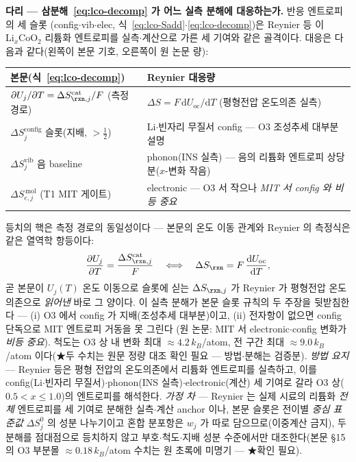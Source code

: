 \begin{srcbox}
\textbf{다리 --- 삼분해~\eqref{eq:lco-decomp} 가 어느 실측 분해에 대응하는가.} 반응 엔트로피의 세 슬롯
(config$\cdot$vib$\cdot$elec, 식~\eqref{eq:lco-Sadd}$\cdot$\eqref{eq:lco-decomp})은 Reynier
등\cite{reynier2004} 이 $\mathrm{Li}_x\mathrm{CoO_2}$ 리튬화 엔트로피를 실측$\cdot$계산으로 가른 세 기여와
같은 골격이다. 대응은 다음과 같다(왼쪽이 본문 기호, 오른쪽이 원 논문 량):
\begin{center}\footnotesize
\begin{tabular}{@{}ll@{}}
\hline
본문(식~\eqref{eq:lco-decomp}) & Reynier\cite{reynier2004} 대응량 \\
\hline
$\partial U_j/\partial T=\Delta S_{\rxn,j}^\mathrm{cat}/F$ (측정 경로) & $\Delta S=F\,\mathrm dU_\mathrm{oc}/\mathrm dT$ (평형전압 온도의존 실측) \\
$\Delta S_j^\mathrm{config}$ 슬롯(지배, $>\tfrac12$) & Li$\cdot$빈자리 무질서 config --- O3 조성추세 대부분 설명 \\
$\Delta S_j^\mathrm{vib}$ 음 baseline & phonon(INS 실측) --- 음의 리튬화 엔트로피 상당분($x$-변화 작음) \\
$\Delta S_{e,j}^{\,\mathrm{mol}}$ (T1 MIT 게이트) & electronic --- O3 서 작으나 \emph{MIT 서 config 와 비등 중요} \\
\hline
\end{tabular}
\end{center}
등치의 핵은 측정 경로의 동일성이다 --- 본문의 온도 이동 관계와 Reynier 의 측정식은 같은 열역학
항등이다:
\begin{equation}
\frac{\partial U_j}{\partial T}=\frac{\Delta S_{\rxn,j}^\mathrm{cat}}{F}
\quad\Longleftrightarrow\quad
\Delta S_{\rxn}=F\,\frac{\mathrm dU_\mathrm{oc}}{\mathrm dT},
\label{eq:br-reynier2004-1}
\end{equation}
곧 본문이 $U_j(T)$ 온도 이동으로 슬롯에 싣는 $\Delta S_{\rxn,j}$ 가 Reynier 가 평형전압 온도의존으로
\emph{읽어낸} 바로 그 양이다. 이 실측 분해가 본문 슬롯 규칙의 두 주장을 뒷받침한다 --- (i) O3 에서
config 가 지배(조성추세 대부분)이고, (ii) 전자항이 없으면 config 단독으로 MIT 엔트로피 거동을 못 그린다
(원 논문: MIT 서 electronic$\cdot$config 변화가 \emph{비등 중요}). 척도는 O3 상 내 변화 최대
$\approx4.2\,k_B$/atom, 전 구간 최대 $\approx9.0\,k_B$/atom 이다(★두 수치는 원문 정량 대조 확인 필요 --- 방법$\cdot$분해는 검증분). \emph{방법 요지} --- Reynier 등은 평형
전압의 온도의존에서 리튬화 엔트로피를 실측하고, 이를 config(Li$\cdot$빈자리 무질서)$\cdot$phonon(INS
실측)$\cdot$electronic(계산) 세 기여로 갈라 O3 상($0.5{<}x{\le}1.0$)의 엔트로피를 해석한다. \emph{가정
차} --- Reynier 는 실제 시료의 리튬화 \emph{전체} 엔트로피를 세 기여로 분해한 실측$\cdot$계산 anchor 이나,
본문 슬롯은 전이별 \emph{중심 표준값} $\Delta S_j^0$ 의 성분 나누기이고 혼합 분포항은 $w_j$ 가 따로
담으므로(이중계산 금지), 두 분해를 점대점으로 등치하지 않고 부호$\cdot$척도$\cdot$지배 성분 수준에서만
대조한다(본문 §15 의 O3 부분몰 $\approx0.18\,k_B$/atom 수치는 원 초록에 미명기 --- ★확인 필요).
\end{srcbox}


